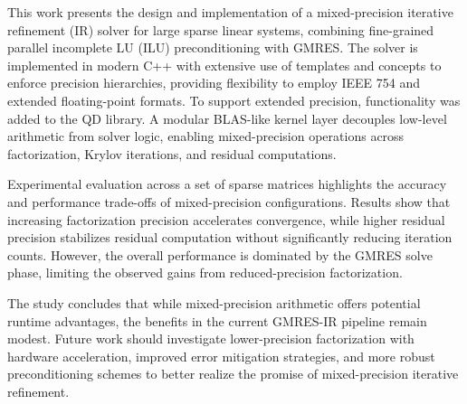 
This work presents the design and implementation of a mixed-precision iterative
refinement (IR) solver for large sparse linear systems, combining fine-grained
parallel incomplete LU (ILU) preconditioning with GMRES. The solver is
implemented in modern C++ with extensive use of templates and concepts to
enforce precision hierarchies, providing flexibility to employ IEEE 754 and
extended floating-point formats. To support extended precision, functionality
was added to the QD library. A modular BLAS-like kernel layer decouples
low-level arithmetic from solver logic, enabling mixed-precision operations
across factorization, Krylov iterations, and residual computations.

Experimental evaluation across a set of sparse matrices highlights the accuracy
and performance trade-offs of mixed-precision configurations. Results show that
increasing factorization precision accelerates convergence, while higher
residual precision stabilizes residual computation without significantly
reducing iteration counts. However, the overall performance is dominated by the
GMRES solve phase, limiting the observed gains from reduced-precision
factorization.

The study concludes that while mixed-precision arithmetic offers potential
runtime advantages, the benefits in the current GMRES-IR pipeline remain modest.
Future work should investigate lower-precision factorization with hardware
acceleration, improved error mitigation strategies, and more robust
preconditioning schemes to better realize the promise of mixed-precision
iterative refinement.
